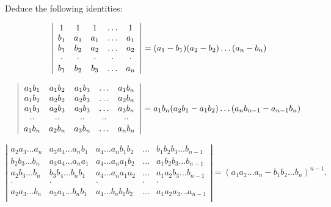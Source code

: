 Deduce the following identities:

\[
\left| \begin{array}{c c c c c} 1 & 1 & 1 & \dots & 1 \\ b _ {1} & a _ {1} & a _ {1} & \dots & a _ {1} \\ b _ {1} & b _ {2} & a _ {2} & \dots & a _ {2} \\ \cdot & \cdot & \cdot & \cdot & \cdot \\ b _ {1} & b _ {2} & b _ {3} & \dots & a _ {n} \end{array} \right| = (a _ {1} - b _ {1}) (a _ {2} - b _ {2}) \dots (a _ {n} - b _ {n})
\]

\[
\left| \begin{array}{c c c c c} a _ {1} b _ {1} & a _ {1} b _ {2} & a _ {1} b _ {3} & \ldots & a _ {1} b _ {n} \\ a _ {1} b _ {2} & a _ {2} b _ {2} & a _ {2} b _ {3} & \ldots & a _ {2} b _ {n} \\ a _ {1} b _ {3} & a _ {2} b _ {3} & a _ {3} b _ {3} & \ldots & a _ {3} b _ {n} \\ \cdot \cdot & \cdot \cdot & \cdot \cdot & \cdot \cdot & \cdot \cdot \\ a _ {1} b _ {n} & a _ {2} b _ {n} & a _ {3} b _ {n} & \ldots & a _ {n} b _ {n} \end{array} \right| = a _ {1} b _ {n} (a _ {2} b _ {1} - a _ {1} b _ {2}) \ldots (a _ {n} b _ {n - 1} - a _ {n - 1} b _ {n})
\]

\[
\left| \begin{array}{cccccc} a _ {2} a _ {3} \ldots a _ {n} & a _ {3} a _ {4} \ldots a _ {n} b _ {1} & a _ {4} \ldots a _ {n} b _ {1} b _ {2} & \ldots & b _ {1} b _ {2} b _ {3} \ldots b _ {n - 1} \\ b _ {2} b _ {3} \ldots b _ {n} & a _ {3} a _ {4} \ldots a _ {n} a _ {1} & a _ {4} \ldots a _ {n} a _ {1} b _ {2} & \ldots & a _ {1} b _ {2} b _ {3} \ldots b _ {n - 1} \\ a _ {2} b _ {3} \ldots b _ {n} & b _ {3} b _ {4} \ldots b _ {n} b _ {1} & a _ {4} \ldots a _ {n} a _ {1} a _ {2} & \ldots & a _ {1} a _ {2} b _ {3} \ldots b _ {n - 1} \\ \cdot & \cdot & \cdot & \cdot & \cdot \\ a _ {2} a _ {3} \ldots b _ {n} & a _ {3} a _ {4} \ldots b _ {n} b _ {1} & a _ {4} \ldots b _ {n} b _ {1} b _ {2} & \ldots & a _ {1} a _ {2} a _ {3} \ldots a _ {n - 1} \\ \end{array} \right| = (a _ {1} a _ {2} \ldots a _ {n} - b _ {1} b _ {2} \ldots b _ {n}) ^ {n - 1}.
\]

